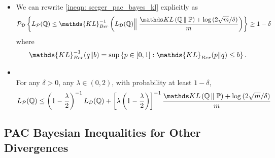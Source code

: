 \documentclass[11pt]{article}
\begin{document}
\begin{itemize}
\item \begin{remark}
We can rewrite \eqref{ineqn: seeger_pac_bayes_kl} explicitly as
\begin{align}
\cP_{\cD}\set{L_{\cP}(\bQ) \le \mathds{KL}_{Ber}^{-1}\paren{L_{\cD}(\bQ) \Bigr\|\; \frac{\kl{\bQ}{\bP} + \log\paren{2\sqrt{m}/\delta}}{m}}} \ge 1 - \delta  \label{ineqn: seeger_pac_bayes_kl_2}
\end{align} where 
\begin{align*}
 \mathds{KL}_{Ber}^{-1}(q \| b) = \sup\set{p \in [0, 1]: \mathds{KL}_{Ber}(p \| q) \le b}.
\end{align*}
\end{remark}

\item \begin{corollary}\citep{alquier2021user}\\
For any $\delta >0$, any $\lambda \in (0, 2)$, with probability at least $1- \delta$,
\begin{align}
L_{\cP}(\bQ) \le \paren{1 - \frac{\lambda}{2}}^{-1}L_{\cD}(\bQ) + \brac{\lambda\paren{1 - \frac{\lambda}{2}}}^{-1}\frac{\kl{\bQ}{\bP} + \log\paren{2\sqrt{m}/\delta}}{m} \label{ineqn: seeger_pac_bayes_kl_modified}
\end{align}
\end{corollary}
\end{itemize}
\subsection{PAC Bayesian Inequalities for Other Divergences}





\newpage


\end{document}
